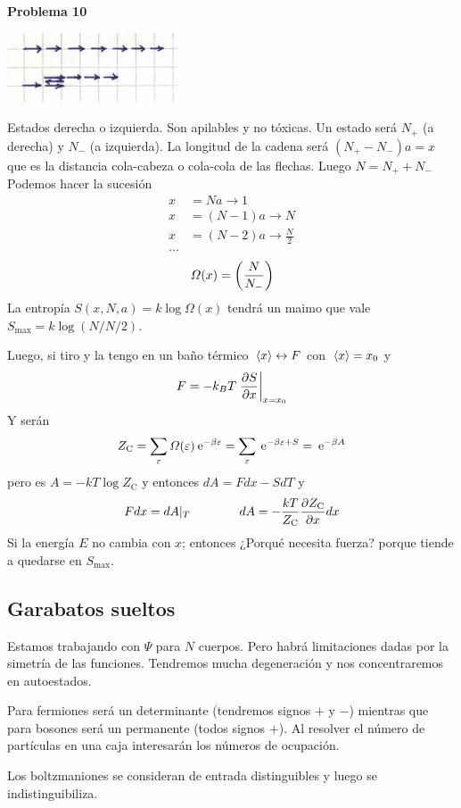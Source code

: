 \documentclass[10pt,oneside]{CBFT_book}
\begin{document}
\begin{ejemplo}{\bf Problema 10}

\includegraphics[scale=0.5]{images/1606329467.jpg}

Estados derecha o izquierda. Son apilables y no tóxicas. Un estado será $N_+$ (a derecha) y $N_-$ (a izquierda).
La longitud de la cadena será $( N_+ - N_- ) a = x$ que es la distancia cola-cabeza o cola-cola de las flechas.
Luego $ N = N_+ + N_-$ 
Podemos hacer la sucesión
\[
	\begin{aligned}
		x &= Na \to  1 \\
		x &= (N-1) a \to  N \\
		x &= (N-2) a \to  \frac N 2  \\
		. . .
	\end{aligned}
\]
\[
	\Omega(x) = \left( \frac{ N }{ N_- } \right) 
\]
La entropía $S(x,N,a) = k \log \Omega(x) $ tendrá un maimo que vale $S_\text{max} = k \log ( N / N/2 )$.

Luego, si tiro y la tengo en un baño térmico $ \:\left\langle x \right\rangle \leftrightarrow F$ con $\:\left\langle x \right\rangle = x_0$ y
\[
	F = - k_B T \left.\frac{\partial^{\hspace{-0.05em}} {S}}{\partial {x}^{\hspace{-0.05em}}}\right|_{x=x_0}
\]
Y serán
\[
	Z_\text{C} = \sum_\varepsilon \Omega( \varepsilon ) \:\mathrm{e}^{ - \beta \varepsilon } = 
	\sum_\varepsilon \:\mathrm{e}^{ - \beta \varepsilon + S } = \:\mathrm{e}^{ - \beta A }
\]
pero es $ A = - k T \log Z_\text{C}$ y entonces $ dA = F dx - S dT $ y
\[
	F dx = dA |_T \qquad \qquad dA = - \frac{ k T }{ Z_\text{C} } \frac{\partial^{\hspace{-0.05em}} {Z_\text{C}}}{\partial {x}^{\hspace{-0.05em}}} dx
\]
Si la energía $E$ no cambia con $x$; entonces ¿Porqué necesita fuerza? porque tiende a quedarse en $S_\text{max}$.


\subsection{Garabatos sueltos}

Estamos trabajando con $\Psi$ para $N$ cuerpos. Pero habrá limitaciones dadas por la simetría de las funciones.
Tendremos mucha degeneración y nos concentraremos en autoestados.

Para fermiones será un determinante (tendremos signos $+$ y $-$) mientras que para bosones será un
permanente (todos signos $+$). Al resolver el número de partículas en una caja interesarán los números
de ocupación.

Los boltzmaniones se consideran de entrada distinguibles y luego se indistinguibiliza.


\end{ejemplo}
\end{document}
